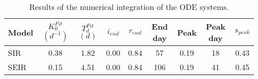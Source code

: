 \begin{table}[h]
\centering
\caption{Results of the numerical integration of the ODE systems.}
\label{tab:models}
\begin{tabular}{lcccccccc}
\toprule
           Model & $K_0^{Fit}$ $(d^{-1})$ & $T_d^{Fit}$ $(d)$ & $i_{end}$ & $r_{end}$ & End day & Peak  & Peak day & $s_{peak}$\\
\midrule
SIR &               0.38 &              1.82 &      0.00 &      0.84 &             57 &      0.19 &              18   &   0.43 \\
SEIR &              0.15 &              4.51 &      0.00 &      0.84 &            106 &      0.19 &              41   &   0.45 \\
\bottomrule
\end{tabular}
\end{table}